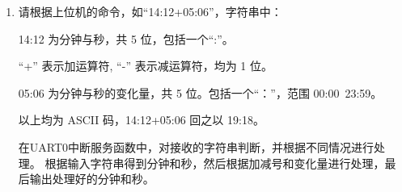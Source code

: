 \documentclass[12pt, a4paper, oneside]{ctexart}
\begin{document}
\begin{enumerate}[listparindent=2em]
        {\kaishu 在UART0中断服务函数中，对接收的字符串判断，并根据不同情况进行处理，
        发送相应的字符串即可。
        
        定义一个表示月份的全局数组以便操作，并定义两个全局变量分别表示接收到的月份和要增加的月份。}
        
    \begin{lstlisting}     
char *month[] = {"JAN", "FEB", "MAR", "APR", "MAY", "JUN", "JUL", "AUG", "SEP", "OCT", "NOV", "DEC"};  
int8\_t mouth=0,add=0; // 接收到的月份和要增加的月份
    \end{lstlisting}

        {\kaishu 在UART0中断服务函数中，以非阻塞方式接收字符，
        并进行判断，以确定对应的月份和月份增加数。}

        \begin{lstlisting}[language=C++]
void UART0_Handler() {
    .....
    UARTStringGetNonBlocking(msg); // 接收字符串
    for (int i=0;i<12;i++) {
        if (strncmp(msg, month[i], 3) == 0) {
            mouth = i;
            break;
        }
        if (i==11) {
            UARTStringPutNonBlocking("Invalid month!\n");
            return;
        }
    }
    
    // 确定增加的月份
    if (msg[3] == '+') { 
        add = (msg[4]-'0')*10 + (msg[5]-'0');
        mouth += add;
        mouth %= 12; // 防止超界
    } else if (msg[3] == '-') {
        add = (msg[4]-'0')*10 + (msg[5]-'0');
        mouth -= add;
        mouth = (mouth+12)%12; // 防止超界
    } else {
        UARTStringPutNonBlocking("Invalid command!\n");
        return;
    }

    UARTStringPutNonBlocking(month[mouth]); // 输出处理好的月份


}

    \end{lstlisting}
    
    \item 请根据上位机的命令，如“14:12+05:06”，字符串中：
    
    14:12 为分钟与秒，共 5 位，包括一个“:”。

    “+” 表示加运算符, “-” 表示减运算符，均为 1 位。

    05:06 为分钟与秒的变化量，共 5 位。包括一个“：”，范围 00:00~23:59。

    以上均为 ASCII 码，14:12+05:06 回之以 19:18。

    {\kaishu 在UART0中断服务函数中，对接收的字符串判断，并根据不同情况进行处理。
    根据输入字符串得到分钟和秒，然后根据加减号和变化量进行处理，最后输出处理好的分钟和秒。}


\end{enumerate}
\end{document}
